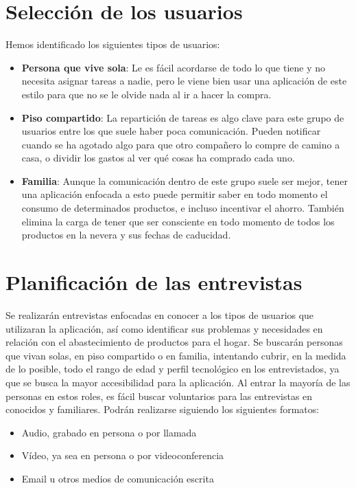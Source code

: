 \section{Selección de los usuarios}
Hemos identificado los siguientes tipos de usuarios:
\begin{itemize}
    \item \textbf{Persona que vive sola}: Le es fácil acordarse de todo lo que tiene y no necesita asignar tareas a nadie, pero le viene bien usar una aplicación de este estilo para que no se le olvide nada al ir a hacer la compra.
    \item \textbf{Piso compartido}: La repartición de tareas es algo clave para este grupo de usuarios entre los que suele haber poca comunicación. Pueden notificar cuando se ha agotado algo para que otro compañero lo compre de camino a casa, o dividir los gastos al ver qué cosas ha comprado cada uno.
    \item \textbf{Familia}: Aunque la comunicación dentro de este grupo suele ser mejor, tener una aplicación enfocada a esto puede permitir saber en todo momento el consumo de determinados productos, e incluso incentivar el ahorro. También elimina la carga de tener que ser consciente en todo momento de todos los productos en la nevera y sus fechas de caducidad.
\end{itemize}

\section{Planificación de las entrevistas}
Se realizarán entrevistas enfocadas en conocer a los tipos de usuarios que utilizaran la aplicación, así como identificar sus problemas y necesidades en relación con el abastecimiento de productos para el hogar. Se buscarán personas que vivan solas, en piso compartido o en familia, intentando cubrir, en la medida de lo posible, todo el rango de edad y perfil tecnológico en los entrevistados, ya que se busca la mayor accesibilidad para la aplicación. 
Al entrar la mayoría de las personas en estos roles, es fácil buscar voluntarios para las entrevistas en conocidos y familiares.
Podrán realizarse siguiendo los siguientes formatos:
\begin{itemize}
    \item Audio, grabado en persona o por llamada
    \item Vídeo, ya sea en persona o por videoconferencia
    \item Email u otros medios de comunicación escrita
\end{itemize}

